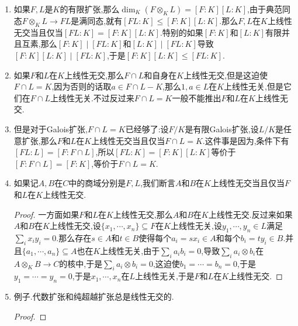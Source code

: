 \begin{enumerate}
\begin{proof}
    	由于$K$是域,典范同态$A\otimes_KB\to A'\otimes_KB'$是单射,所以如果$A'\otimes_KB'\to C$,$a'\otimes b'\mapsto a'b'$是单射,那么限制在$A\otimes_KB$上也是单射.
    \end{proof}
    \item 如果$F,L$是$K$的有限扩张,那么$\dim_K(F\otimes_KL)=[F:K][L:K]$,由于典范同态$F\otimes_KL\to FL$是满同态,就有$[FL:K]\le[F:K][L:K]$.那么$F,L$在$K$上线性无交当且仅当$[FL:K]=[F:K][L:K]$.特别的如果$[F:K]$和$[L:K]$有限并且互素,那么$[F:K]\mid[FL:K]$和$[L:K]\mid[FL:K]$导致$[F:K][L:K]\mid[FL:K]$,于是$[F:K][L:K]\le[FL:K]$.
    \item 如果$F$和$L$在$K$上线性无交,那么$F\cap L$和自身在$K$上线性无交,但是这迫使$F\cap L=K$,因为否则的话取$a\in F\cap L-K$,那么$1,a\in L$在$K$上线性无关,但是它们在$F\cap L$上线性无关.不过反过来$F\cap L=K$一般不能推出$F$和$L$在$K$上线性无交.
    \item 但是对于Galois扩张,$F\cap L=K$已经够了:设$F/K$是有限Galois扩张,设$L/K$是任意扩张,那么$F$和$L$在$K$上线性无交当且仅当$F\cap L=K$.这件事是因为,条件下有$[FL:L]=[F:F\cap L]$,所以$[FL:K]=[F:K][L:K]$等价于$[F:F\cap L]=[F:K]$,等价于$F\cap L=K$.
    \item 如果记$A,B$在$C$中的商域分别是$F,L$,我们断言$A$和$B$在$K$上线性无交当且仅当$F$和$L$在$K$上线性无交.
    \begin{proof}
    	
    	一方面如果$F$和$L$在$K$上线性无交,那么$A$和$B$在$K$上线性无交.反过来如果$A$和$B$在$K$上线性无交,设$\{x_1,\cdots,x_n\}\subseteq F$在$K$上线性无关,设$y_1,\cdots,y_n\in L$满足$\sum_ix_iy_i=0$.那么存在$s\in A$和$t\in B$使得每个$a_i=sx_i\in A$和每个$b_i=ty_i\in B$.并且$\{a_1,\cdots,a_n\}\subseteq A$也在$K$上线性无关,由于$\sum_ia_ib_i=0$,导致$\sum_ia_i\otimes b_i$在$A\otimes_KB\to C$的核中,于是$\sum_ia_i\otimes b_i=0$,这迫使$b_1=\cdots=b_n=0$,于是$y_1=\cdots=y_n=0$,于是$x_1,\cdots,x_n$在$L$上线性无关,于是$F$和$L$在$K$上线性无交.
    \end{proof}
    \item 例子.代数扩张和纯超越扩张总是线性无交的.
    \begin{proof}
    	

\end{proof}
\end{enumerate}
